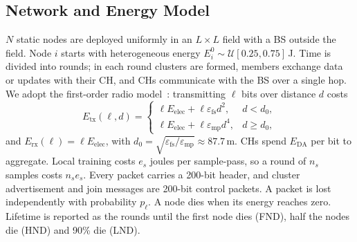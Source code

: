 \documentclass[journal,onecolumn,draftclsnofoot,12pt]{IEEEtran}
\begin{document}
\subsection{Network and Energy Model}
$N$ static nodes are deployed uniformly in an $L\times L$ field with a BS outside the field. Node $i$ starts with heterogeneous energy $E_i^0\sim\mathcal{U}[0.25,0.75]$\,J. Time is divided into rounds; in each round clusters are formed, members exchange data or updates with their CH, and CHs communicate with the BS over a single hop. We adopt the first-order radio model~\cite{heinzelman2002}: transmitting $\ell$ bits over distance $d$ costs
\begin{equation}
E_{\mathrm{tx}}(\ell,d)=\begin{cases}\ell E_{\mathrm{elec}}+\ell\varepsilon_{\mathrm{fs}}d^{2}, & d<d_0,\\ \ell E_{\mathrm{elec}}+\ell\varepsilon_{\mathrm{mp}}d^{4}, & d\ge d_0,\end{cases}
\end{equation}
and $E_{\mathrm{rx}}(\ell)=\ell E_{\mathrm{elec}}$,
with $d_0=\sqrt{\varepsilon_{\mathrm{fs}}/\varepsilon_{\mathrm{mp}}}\approx 87.7$\,m. CHs spend $E_{\mathrm{DA}}$ per bit to aggregate. Local training costs $e_s$ joules per sample-pass, so a round of $n_s$ samples costs $n_se_s$. Every packet carries a 200-bit header, and cluster advertisement and join messages are 200-bit control packets. A packet is lost independently with probability $p_\ell$. A node dies when its energy reaches zero. Lifetime is reported as the rounds until the first node dies (FND), half the nodes die (HND) and 90\% die (LND).
\end{document}
